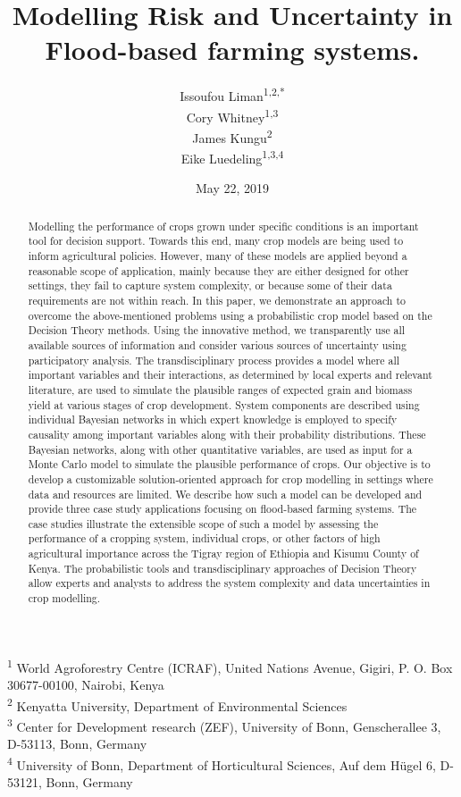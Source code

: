 \documentclass[12pt,oneside]{article}
\title{Modelling Risk and Uncertainty in Flood-based farming systems.}
\author{Issoufou Liman\textsuperscript{1,2,*} \\ Cory Whitney\textsuperscript{1,3} \\ James Kungu\textsuperscript{2} \\ Eike Luedeling\textsuperscript{1,3,4}}
\date{May 22, 2019}
\begin{document}
\maketitle
\begin{abstract}
Modelling the performance of crops grown under specific conditions is an important tool for decision support. Towards this end, many crop models are being used to inform agricultural policies. However, many of these models are applied beyond a reasonable scope of application, mainly because they are either designed for other settings, they fail to capture system complexity, or because some of their data requirements are not within reach. In this paper, we demonstrate an approach to overcome the above-mentioned problems using a probabilistic crop model based on the Decision Theory methods. Using the innovative method, we transparently use all available sources of information and consider various sources of uncertainty using participatory analysis. The transdisciplinary process provides a model where all important variables and their interactions, as determined by local experts and relevant literature, are used to simulate the plausible ranges of expected grain and biomass yield at various stages of crop development. System components are described using individual Bayesian networks in which expert knowledge is employed to specify causality among important variables along with their probability distributions. These Bayesian networks, along with other quantitative variables, are used as input for a Monte Carlo model to simulate the plausible performance of crops. Our objective is to develop a customizable solution-oriented approach for crop modelling in settings where data and resources are limited. We describe how such a model can be developed and provide three case study applications focusing on flood-based farming systems. The case studies illustrate the extensible scope of such a model by assessing the performance of a cropping system, individual crops, or other factors of high agricultural importance across the Tigray region of Ethiopia and Kisumu County of Kenya. The probabilistic tools and transdisciplinary approaches of Decision Theory allow experts and analysts to address the system complexity and data uncertainties in crop modelling.
\end{abstract}

{
\hypersetup{linkcolor=black}
\setcounter{tocdepth}{5}
\tableofcontents
}
\textsuperscript{1} World Agroforestry Centre (ICRAF), United Nations Avenue, Gigiri, P. O. Box 30677-00100, Nairobi, Kenya\\
\textsuperscript{2} Kenyatta University, Department of Environmental Sciences\\
\textsuperscript{3} Center for Development research (ZEF), University of Bonn, Genscherallee 3, D-53113, Bonn, Germany\\
\textsuperscript{4} University of Bonn, Department of Horticultural Sciences, Auf dem Hügel 6, D-53121, Bonn, Germany
\end{document}

